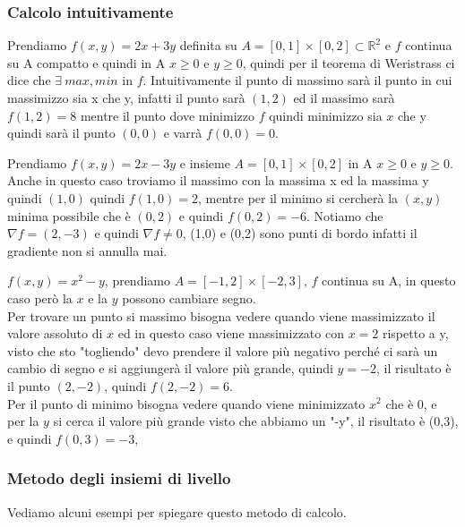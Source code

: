 \subsubsection{Calcolo intuitivamente}
\begin{example}
Prendiamo $f(x,y) = 2x+3y$ definita su $A = [0,1] \times [0,2] \subset \mathbb{R}^2$ e $f$ continua su A compatto e quindi in A $x \geq 0$ e $y \geq 0$, quindi per il teorema di Weristrass ci dice che $\exists \: max,min$ in $f$. Intuitivamente il punto di massimo sarà il punto in cui massimizzo sia x che y, infatti il punto sarà $(1,2)$ ed il massimo sarà $f(1,2) = 8$ mentre il punto dove minimizzo $f$ quindi minimizzo sia $x$ che y quindi sarà il punto $(0,0)$ e varrà $f(0,0) = 0$.
\end{example}
\begin{example}
Prendiamo $f(x,y) = 2x-3y$ e insieme $A = [0,1] \times [0,2]$ in A $x \geq 0$ e $y \geq 0$. Anche in questo caso troviamo il massimo con la massima x ed la massima y quindi $(1,0)$ quindi $f(1,0) = 2$, mentre per il minimo si cercherà la $(x,y)$ minima possibile che è $(0,2)$ e quindi $f(0,2) = -6$. Notiamo che $\nabla f = (2,-3)$ e quindi $\nabla f \neq 0$, (1,0) e (0,2) sono punti di bordo infatti il gradiente non si annulla mai.
\end{example}
\begin{example}
$f(x,y) = x^2 - y$, prendiamo $A = [-1,2] \times [-2,3]$, $f$ continua su A, in questo caso però la $x$ e la $y$ possono cambiare segno. \\
Per trovare un punto si massimo bisogna vedere quando viene massimizzato il valore assoluto di $x$ ed in questo caso viene massimizzato con $x=2$ rispetto a y, visto che sto "togliendo" devo prendere il valore più negativo perché ci sarà un cambio di segno e si aggiungerà il valore più grande, quindi $y = -2$, il risultato è il punto $(2,-2)$, quindi $f(2,-2) = 6$.\\
Per il punto di minimo bisogna vedere quando viene minimizzato $x^2$ che è 0, e per la $y$ si cerca il valore più grande visto che abbiamo un "-y", il risultato è (0,3), e quindi $f(0,3) = -3$,
\end{example}
\subsubsection{Metodo degli insiemi di livello}
Vediamo alcuni esempi per spiegare questo metodo di calcolo.

